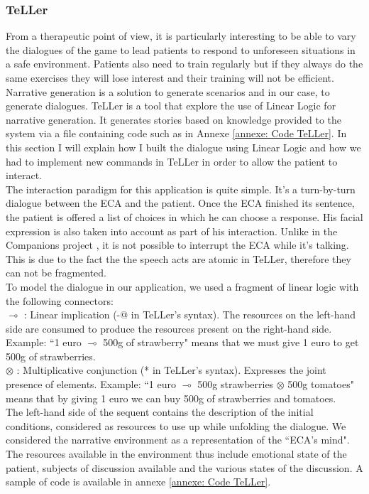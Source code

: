 \documentclass[11pt]{article}
\begin{document}
\subsubsection{TeLLer}
From a therapeutic point of view, it is particularly interesting to be able to vary the dialogues of the game to lead patients to respond to unforeseen situations in a safe environment. Patients also need to train regularly but if they always do the same exercises they will lose interest and their training will not be efficient. \\

Narrative generation is a solution to generate scenarios and in our case, to generate dialogues. TeLLer is a tool that explore the use of Linear Logic for narrative generation. It generates stories based on knowledge provided to the system via a file containing code such as in Annexe \ref{annexe: Code TeLLer}. In this section I will explain how I built the dialogue using Linear Logic and how we had to implement new commands in TeLLer in order to allow the patient to interact.\\

The interaction paradigm for this application is quite simple. It's a turn-by-turn dialogue between the ECA and the patient. Once the ECA finished its sentence, the patient is offered a list of choices in which he can choose a response. His facial expression is also taken into account as part of his interaction. Unlike in the Companions project \citep{Smith11}, it is not possible to interrupt the ECA while it's talking. This is due to the fact the the speech acts are atomic in TeLLer, therefore they can not be fragmented.\\ 

To model the dialogue in our application, we used a fragment of linear logic with the following connectors:\\
$\multimap$ : Linear implication (-@ in TeLLer's syntax). The resources on the left-hand side are consumed to produce the resources present on the right-hand side. Example: ``1 euro $\multimap$ 500g of strawberry" means that we must give 1 euro to get 500g of strawberries.\\
$\otimes$ : Multiplicative conjunction (* in TeLLer's syntax). Expresses the joint presence of elements. Example: ``1 euro $\multimap$ 500g strawberries $\otimes$ 500g tomatoes" means that by giving 1 euro we can buy 500g of strawberries and tomatoes. \\

The left-hand side of the sequent contains the description of the initial conditions, considered as resources to use up while unfolding the dialogue. We considered the narrative environment as a representation of the ``ECA's mind". The resources available in the environment thus include emotional state of the patient, subjects of discussion available and the various states of the discussion. A sample of code is available in annexe \ref{annexe: Code TeLLer}.\\
\end{document}
